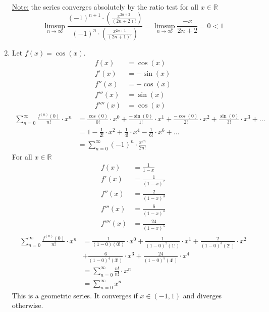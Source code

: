 \documentclass[12pt]{article}
\begin{document}
\begin{prf}{}
\begin{enumerate}
\begin{align*}
        \end{align*}
        \underline{Note:} the series converges absolutely by the ratio test for all \(x \in \mathbb{R}\)
        \[\limsup_{n \to \infty} \frac{\left(-1\right)^{n+1}\cdot \left(\frac{x^{2n+2}}{\left(2n+2\right)!}\right)}{\left(-1\right)^n\cdot \left(\frac{x^{2n+1}}{\left(2n+1\right)!}\right)} = \limsup_{n \to \infty} \frac{-x}{2n+2} = 0 < 1\]       
        \item Let \(f(x) = \cos(x)\).\\
        \begin{align*}
            f(x) &= \cos(x)\\
            f'(x) &= - \sin(x)\\
            f''(x) &= - \cos(x)\\
            f'''(x) &= \sin(x)\\
            f''''(x) &= \cos(x)
        \end{align*}
        \begin{align*}
            \displaystyle\sum^\infty_{n=0} \frac{f^{(n)}(0)}{n!} \cdot x^n &= \frac{\cos(0)}{0!} \cdot x^0 + \frac{- \sin(0)}{1!} \cdot x^1 + \frac{- \cos(0)}{2!} \cdot x^2 + \frac{\sin(0)}{3!}\cdot x^3 + \dots\\
            &= 1 - \frac{1}{2!} \cdot x^2 + \frac{1}{4!} \cdot x^4 - \frac{1}{6!} \cdot x^6 + \dots\\
            &= \displaystyle\sum^\infty_{n=0} (-1)^{n} \cdot \frac{x^{2n}}{2n!}
        \end{align*}
        For all \(x \in \mathbb{R}\)
        \begin{align*}
            f(x) &= \frac{1}{1-x}\\
            f'(x) &= \frac{1}{(1-x)^2}\\
            f''(x) &= \frac{2}{(1-x)^3}\\
            f'''(x) &= \frac{6}{(1-x)^4}\\
            f''''(x) &= \frac{24}{(1-x)^5}
        \end{align*}
        \begin{align*}
            \displaystyle\sum^\infty_{n=0} \frac{f^{(n)}(0)}{n!} \cdot x^n &= \frac{1}{(1-0)(0!)} \cdot x^0 + \frac{1}{(1-0)^2(1!)} \cdot x^1 + \frac{2}{(1-0)^3(2!)} \cdot x^2\\
            &+ \frac{6}{(1-0)^4(3!)} \cdot x^3 + \frac{24}{(1-0)^5(4!)} \cdot x^4\\
            &= \displaystyle\sum^\infty_{n=0} \frac{n!}{n!} \cdot x^n\\
            &= \displaystyle\sum^\infty_{n=0} x^n
        \end{align*}
        This is a geometric series. It converges if \(x \in (-1,1)\) and diverges otherwise.
    \end{enumerate} 
\end{prf}
\end{document}
